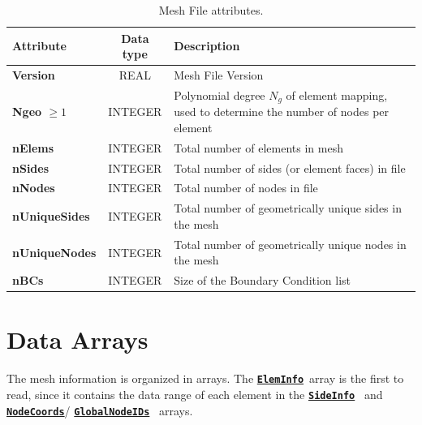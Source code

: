 \documentclass[a4paper,headsepline]{scrreprt}
\newcommand\Ngeo{N_g}
\newcommand\ttbf[1]{\textbf{\texttt{#1}}}
\newcommand\ElemInfo{\hyperlink{ElemInfo}{\ttbf{ElemInfo}}}
\newcommand\SideInfo{\hyperlink{SideInfo}{\ttbf{SideInfo}}}
\newcommand\NodeCoords{\hyperlink{NodeInfo}{\ttbf{NodeCoords}}}
\newcommand\GlobalNodeIDs{\hyperlink{NodeInfo}{\ttbf{GlobalNodeIDs}}}
\begin{document}
\begin{table}[h!]
\centering
\begin{tabularx}{1.0\textwidth}{|>{\bfseries\ttfamily}l|c|X|} \hline
\normalfont\textbf{Attribute}   & \textbf{Data type}  & \textbf{Description} \\ \hline\hline
Version       & REAL    & Mesh File Version \\\hline
Ngeo $\geq 1$ & INTEGER & Polynomial degree $\Ngeo$ of element mapping, used to determine the number of nodes per element \\\hline
nElems        & INTEGER & Total number of elements in mesh\\\hline
nSides        & INTEGER & Total number of sides (or element faces) in file\\\hline
nNodes        & INTEGER & Total number of nodes in file \\\hline
nUniqueSides  & INTEGER & Total number of geometrically unique sides in the mesh \\\hline
nUniqueNodes  & INTEGER & Total number of geometrically unique nodes in the mesh \\\hline
nBCs          & INTEGER & Size of the Boundary Condition list \\\hline
\end{tabularx}
\caption{Mesh File attributes.}
\end{table}

\clearpage
\section{Data Arrays}
The mesh information is organized in arrays. The \ElemInfo~array is the first to read, since it contains the data range of each element in the \SideInfo~ and \NodeCoords / \GlobalNodeIDs~ arrays. 
\end{document}

